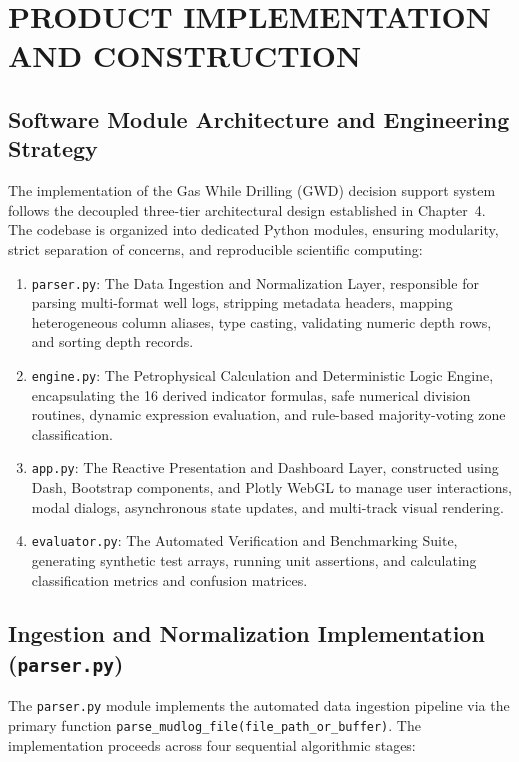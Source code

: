 \chapter{PRODUCT IMPLEMENTATION AND CONSTRUCTION}

\section{Software Module Architecture and Engineering Strategy}

The implementation of the Gas While Drilling (GWD) decision support system follows the decoupled three-tier architectural design established in Chapter~4. The codebase is organized into dedicated Python modules, ensuring modularity, strict separation of concerns, and reproducible scientific computing:

\begin{enumerate}
    \item \texttt{parser.py}: The Data Ingestion and Normalization Layer, responsible for parsing multi-format well logs, stripping metadata headers, mapping heterogeneous column aliases, type casting, validating numeric depth rows, and sorting depth records.
    \item \texttt{engine.py}: The Petrophysical Calculation and Deterministic Logic Engine, encapsulating the 16 derived indicator formulas, safe numerical division routines, dynamic expression evaluation, and rule-based majority-voting zone classification.
    \item \texttt{app.py}: The Reactive Presentation and Dashboard Layer, constructed using Dash, Bootstrap components, and Plotly WebGL to manage user interactions, modal dialogs, asynchronous state updates, and multi-track visual rendering.
    \item \texttt{evaluator.py}: The Automated Verification and Benchmarking Suite, generating synthetic test arrays, running unit assertions, and calculating classification metrics and confusion matrices.
\end{enumerate}

\section{Ingestion and Normalization Implementation (\texttt{parser.py})}

The \texttt{parser.py} module implements the automated data ingestion pipeline via the primary function \texttt{parse\_mudlog\_file(file\_path\_or\_buffer)}. The implementation proceeds across four sequential algorithmic stages:

